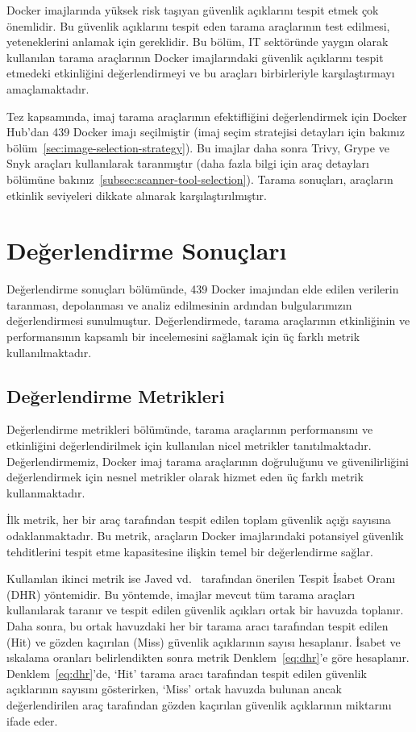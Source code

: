 Docker imajlarında yüksek risk taşıyan güvenlik açıklarını tespit etmek çok önemlidir. Bu güvenlik açıklarını tespit eden tarama araçlarının test edilmesi, yeteneklerini anlamak için gereklidir. Bu bölüm, IT sektöründe yaygın olarak kullanılan tarama araçlarının Docker imajlarındaki güvenlik açıklarını tespit etmedeki etkinliğini değerlendirmeyi ve bu araçları birbirleriyle karşılaştırmayı amaçlamaktadır.

Tez kapsamında, imaj tarama araçlarının efektifliğini değerlendirmek için Docker Hub'dan 439 Docker imajı seçilmiştir (imaj seçim stratejisi detayları için bakınız bölüm~\ref{sec:image-selection-strategy}). Bu imajlar daha sonra Trivy, Grype ve Snyk araçları kullanılarak taranmıştır (daha fazla bilgi için araç detayları bölümüne bakınız~\ref{subsec:scanner-tool-selection}). Tarama sonuçları, araçların etkinlik seviyeleri dikkate alınarak karşılaştırılmıştır.

\section{Değerlendirme Sonuçları}\label{sec:ExperimentalResults}

Değerlendirme sonuçları bölümünde, 439 Docker imajından elde edilen verilerin taranması, depolanması ve analiz edilmesinin ardından bulgularımızın değerlendirmesi sunulmuştur. Değerlendirmede, tarama araçlarının etkinliğinin ve performansının kapsamlı bir incelemesini sağlamak için üç farklı metrik kullanılmaktadır.

\subsection{Değerlendirme Metrikleri}\label{sec:EvaluationMetrics}

Değerlendirme metrikleri bölümünde, tarama araçlarının performansını ve etkinliğini değerlendirilmek için kullanılan nicel metrikler tanıtılmaktadır. Değerlendirmemiz, Docker imaj tarama araçlarının doğruluğunu ve güvenilirliğini değerlendirmek için nesnel metrikler olarak hizmet eden üç farklı metrik kullanmaktadır.

İlk metrik, her bir araç tarafından tespit edilen toplam güvenlik açığı sayısına odaklanmaktadır. Bu metrik, araçların Docker imajlarındaki potansiyel güvenlik tehditlerini tespit etme kapasitesine ilişkin temel bir değerlendirme sağlar.

Kullanılan ikinci metrik ise Javed vd.~\autocite{Javed2021} tarafından önerilen Tespit İsabet Oranı (DHR) yöntemidir. Bu yöntemde, imajlar mevcut tüm tarama araçları kullanılarak taranır ve tespit edilen güvenlik açıkları ortak bir havuzda toplanır. Daha sonra, bu ortak havuzdaki her bir tarama aracı tarafından tespit edilen (Hit) ve gözden kaçırılan (Miss) güvenlik açıklarının sayısı hesaplanır. İsabet ve ıskalama oranları belirlendikten sonra metrik Denklem~\ref{eq:dhr}'e göre hesaplanır. Denklem~\ref{eq:dhr}'de, `Hit' tarama aracı tarafından tespit edilen güvenlik açıklarının sayısını gösterirken, `Miss' ortak havuzda bulunan ancak değerlendirilen araç tarafından gözden kaçırılan güvenlik açıklarının miktarını ifade eder.

